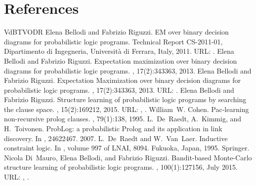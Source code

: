 \documentclass[letterpaper,10pt,english]{sphinxmanual}
\begin{document}
\chapter{References}
\label{\detokenize{index:references}}


\begin{sphinxthebibliography}{VdBTVODR}
Elena Bellodi and Fabrizio Riguzzi. EM over binary decision diagrams for probabilistic logic programs. Technical Report CS-2011-01, Dipartimento di Ingegneria, Università di Ferrara, Italy, 2011. URL: .
Elena Bellodi and Fabrizio Riguzzi. Expectation maximization over binary decision diagrams for probabilistic logic programs. , 17(2):343\textendash{}363, 2013.
Elena Bellodi and Fabrizio Riguzzi. Expectation Maximization over binary decision diagrams for probabilistic logic programs. , 17(2):343\textendash{}363, 2013. URL: .
Elena Bellodi and Fabrizio Riguzzi. Structure learning of probabilistic logic programs by searching the clause space. , 15(2):169\textendash{}212, 2015. URL: , .
William W. Cohen. Pac-learning non-recursive prolog clauses. , 79(1):1\textendash{}38, 1995.
L. De Raedt, A. Kimmig, and H. Toivonen. ProbLog: a probabilistic Prolog and its application in link discovery. In , 2462\textendash{}2467. 2007.
L. De Raedt and W. Van Laer. Inductive constraint logic. In , volume 997 of LNAI, 80\textendash{}94. Fukuoka, Japan, 1995. Springer.
Nicola Di Mauro, Elena Bellodi, and Fabrizio Riguzzi. Bandit-based Monte-Carlo structure learning of probabilistic logic programs. , 100(1):127\textendash{}156, July 2015. URL: , .

\end{sphinxthebibliography}
\end{document}
